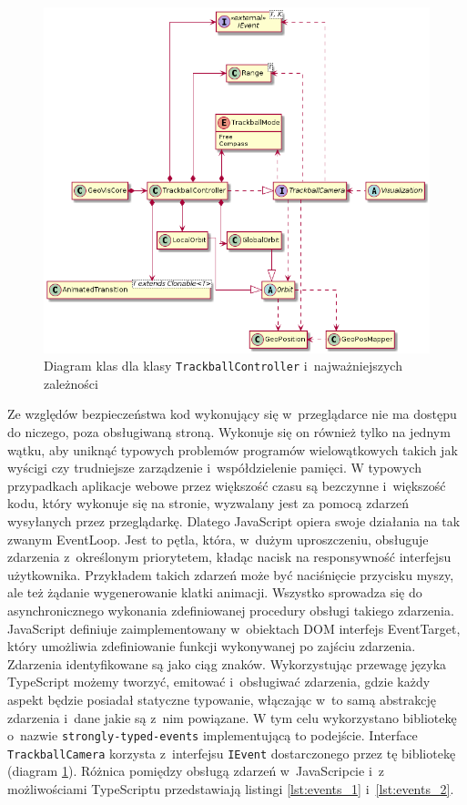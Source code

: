 \begin{figure}
    \centering
    \includegraphics[width=\linewidth]{diagrams/out/c3_trackball.png}
    \caption{Diagram klas dla klasy \texttt{TrackballController} i~najważniejszych zależności}
    \label{fig:c3_trackball}
\end{figure}

Ze względów bezpieczeństwa kod wykonujący się w~przeglądarce nie ma dostępu do niczego, poza obsługiwaną stroną. Wykonuje się on również tylko na jednym wątku, aby uniknąć typowych problemów programów wielowątkowych takich jak wyścigi czy trudniejsze zarządzenie i~współdzielenie pamięci. W typowych przypadkach aplikacje webowe przez większość czasu są bezczynne i~większość kodu, który wykonuje się na stronie, wyzwalany jest za pomocą zdarzeń wysyłanych przez przeglądarkę. Dlatego JavaScript opiera swoje działania na tak zwanym EventLoop. Jest to pętla, która, w~dużym uproszczeniu, obsługuje zdarzenia z~określonym priorytetem, kładąc nacisk na responsywność interfejsu użytkownika. Przykładem takich zdarzeń może być naciśnięcie przycisku myszy, ale też żądanie wygenerowanie klatki animacji. Wszystko sprowadza się do asynchronicznego wykonania zdefiniowanej procedury obsługi takiego zdarzenia. JavaScript definiuje zaimplementowany w~obiektach DOM interfejs EventTarget\cite{JsEvents}, który umożliwia zdefiniowanie funkcji wykonywanej po zajściu zdarzenia. Zdarzenia identyfikowane są jako ciąg znaków. Wykorzystując przewagę języka TypeScript możemy tworzyć, emitować i~obsługiwać zdarzenia, gdzie każdy aspekt będzie posiadał statyczne typowanie, włączając w~to samą abstrakcję zdarzenia i~dane jakie są z~nim powiązane. W tym celu wykorzystano bibliotekę o~nazwie \texttt{strongly-typed-events}\cite{Events} implementującą to podejście. Interface \texttt{TrackballCamera} korzysta z~interfejsu \texttt{IEvent} dostarczonego przez tę bibliotekę (diagram \ref{fig:c3_trackball}). Różnica pomiędzy obsługą zdarzeń w~JavaScripcie i~z możliwościami TypeScriptu przedstawiają listingi \ref{lst:events_1} i~\ref{lst:events_2}.

